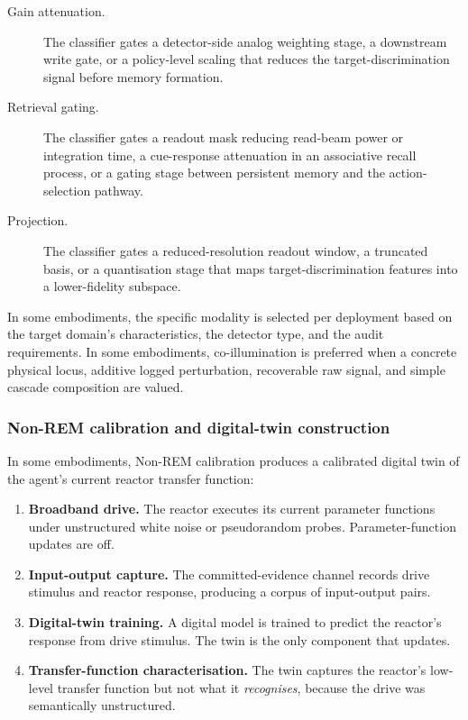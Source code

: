 \documentclass[a4paper,12pt]{article}
\begin{document}
\begin{description}
  \item[Gain attenuation.] The classifier gates a detector-side
    analog weighting stage, a downstream write gate, or a
    policy-level scaling that reduces the target-discrimination
    signal before memory formation.
  \item[Retrieval gating.] The classifier gates a readout mask
    reducing read-beam power or integration time, a cue-response
    attenuation in an associative recall process, or a gating stage
    between persistent memory and the action-selection pathway.
  \item[Projection.] The classifier gates a reduced-resolution
    readout window, a truncated basis, or a quantisation stage that
    maps target-discrimination features into a lower-fidelity
    subspace.
\end{description}

In some embodiments, the specific modality is selected per deployment
based on the target domain's characteristics, the detector type, and
the audit requirements. In some embodiments, co-illumination is
preferred when a concrete physical locus, additive logged
perturbation, recoverable raw signal, and simple cascade composition
are valued.

\subsubsection{Non-REM calibration and digital-twin construction}
\label{sec:non-rem-twin}


In some embodiments, Non-REM calibration produces a calibrated digital
twin of the agent's current reactor transfer function:

\begin{enumerate}
  \item \textbf{Broadband drive.} The reactor executes its current
    parameter functions under unstructured white noise or pseudorandom
    probes. Parameter-function updates are off.
  \item \textbf{Input-output capture.} The committed-evidence channel
    records drive stimulus and reactor response, producing a corpus
    of input-output pairs.
  \item \textbf{Digital-twin training.} A digital model is trained
    to predict the reactor's response from drive stimulus. The twin
    is the only component that updates.
  \item \textbf{Transfer-function characterisation.} The twin
    captures the reactor's low-level transfer function but not what
    it \emph{recognises}, because the drive was semantically
    unstructured.
\end{enumerate}
\end{document}
